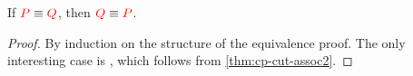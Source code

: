 \begin{theorem}[Symmetry]\label{thm:cp-symmetry}
  If $\textcolor{red}{P} \equiv \textcolor{red}{Q}$, then $\textcolor{red}{Q} \equiv \textcolor{red}{P}$.
\end{theorem}
  \begin{proof}
    By induction on the structure of the equivalence proof.
    The only interesting case is , which follows from
    \cref{thm:cp-cut-assoc2}.
  \end{proof}
